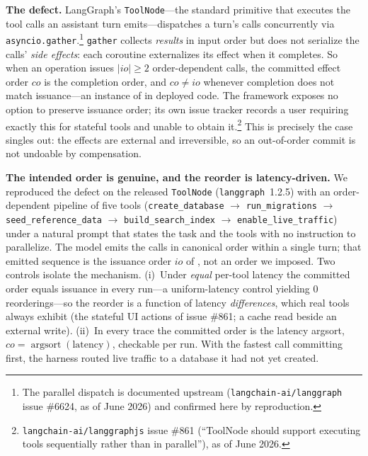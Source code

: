 \documentclass[journal,compsoc,10pt]{IEEEtran}
\theoremstyle{definition}
\theoremstyle{remark}
\newcommand{\fld}[1]{\mathit{#1}}
\begin{document}
\medskip
\noindent\textbf{The defect.} LangGraph's \texttt{ToolNode}---the standard
primitive that executes the tool calls an assistant turn emits---dispatches a
turn's calls concurrently via \texttt{asyncio.gather}.\footnote{The parallel
dispatch is documented upstream (\texttt{langchain-ai/langgraph} issue \#6624,
as of June 2026) and confirmed here by reproduction.} \texttt{gather} collects
\emph{results} in input order but
does not serialize the calls' \emph{side effects}: each coroutine externalizes
its effect when it completes. So when an operation issues $|\fld{io}|\geq 2$
order-dependent calls, the committed effect order $\fld{co}$ is the completion
order, and $\fld{co}\neq\fld{io}$ whenever completion does not match
issuance---an instance of  in deployed code. The framework exposes
no option to preserve issuance order; its own issue tracker records a user
requiring exactly this for stateful tools and unable to obtain
it.\footnote{\texttt{langchain-ai/langgraphjs} issue \#861 (``ToolNode should
support executing tools sequentially rather than in parallel''), as of June 2026.} This is precisely the case
 singles out: the effects are external and irreversible, so an
out-of-order commit is not undoable by compensation.

\medskip
\noindent\textbf{The intended order is genuine, and the reorder is
latency-driven.} We reproduced the defect on the released \texttt{ToolNode}
(\texttt{langgraph}~1.2.5) with an order-dependent pipeline of five tools
(\texttt{create\_database} $\to$ \texttt{run\_migrations} $\to$
\texttt{seed\_reference\_data} $\to$ \texttt{build\_search\_index} $\to$
\texttt{enable\_live\_traffic}) under a natural prompt that states the task and
the tools with no instruction to parallelize. The model emits the calls in
canonical order within a single turn; that emitted sequence is the issuance
order $\fld{io}$ of , not an order we imposed. Two controls
isolate the mechanism. (i)~Under \emph{equal} per-tool latency the committed
order equals issuance in every run---a uniform-latency control yielding $0$
reorderings---so the reorder is a function of latency \emph{differences}, which
real tools always exhibit (the stateful UI actions of issue \#861; a cache read
beside an external write). (ii)~In every trace the committed order is the
latency argsort, $\fld{co}=\operatorname{argsort}(\text{latency})$, checkable
per run. With the fastest call committing first, the harness routed live
traffic to a database it had not yet created.
\end{document}
